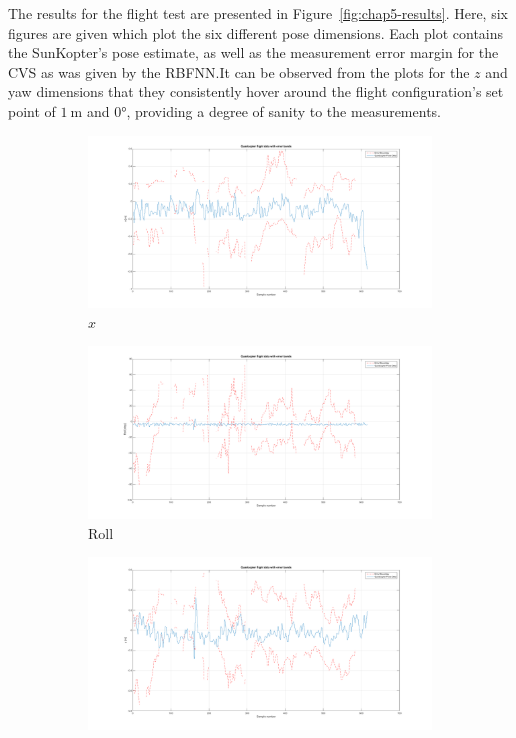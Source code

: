 The results for the flight test are presented in Figure~\ref{fig:chap5-results}. Here, six figures are given which plot the six different pose dimensions. Each plot contains the SunKopter's pose estimate, as well as the measurement error margin for the CVS as was given by the RBFNN.\@ It can be observed from the plots for the $z$ and yaw dimensions that they consistently hover around the flight configuration's set point of $\SI{1}{\m}$ and $\ang{0}$, providing a degree of sanity to the measurements. 
  
\begin{figure}
  \centering
  \begin{subfigure}{0.45\textwidth}
    \includegraphics[clip, trim = 150 0 120 0, width=\textwidth]{figures/chapter5/x}
    \caption{$x$}
  \end{subfigure}
  \begin{subfigure}{0.45\textwidth}
    \includegraphics[clip, trim = 150 0 120 0, width=\textwidth]{figures/chapter5/roll}
    \caption{Roll}
  \end{subfigure}
  \begin{subfigure}{0.45\textwidth}
    \includegraphics[clip, trim = 150 0 120 0, width=\textwidth]{figures/chapter5/y}

\end{subfigure}
\end{figure}
